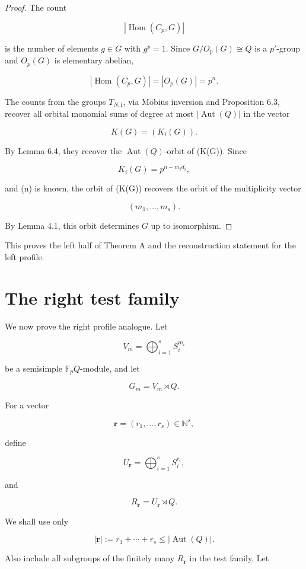 \documentclass[11pt]{article}
\begin{document}
\begin{proof}
The count

\[
|\operatorname{Hom}(C_p,G)|
\]

is the number of elements $g\in G$ with $g^p=1$. Since $G/O_p(G)\cong Q$ is a $p'$-group and $O_p(G)$ is elementary abelian,

\[
|\operatorname{Hom}(C_p,G)|=|O_p(G)|=p^n.
\]

The counts from the groups $T_{N,\mathbf i}$, via Möbius inversion and Proposition 6.3, recover all orbital monomial sums of degree at most $|\operatorname{Aut}(Q)|$ in the vector

\[
K(G)=(K_i(G)).
\]

By Lemma 6.4, they recover the $\operatorname{Aut}(Q)$-orbit of (K(G)). Since

\[
K_i(G)=p^{n-m_id_i},
\]

and (n) is known, the orbit of (K(G)) recovers the orbit of the multiplicity vector

\[
(m_1,\ldots,m_s).
\]

By Lemma 4.1, this orbit determines $G$ up to isomorphism.

\end{proof}

This proves the left half of Theorem A and the reconstruction statement for the left profile.

\section{The right test family}

We now prove the right profile analogue. Let

\[
V_m=\bigoplus_{i=1}^{s}S_i^{m_i}
\]

be a semisimple $\mathbb F_pQ$-module, and let

\[
G_m=V_m\rtimes Q.
\]

For a vector

\[
\mathbf r=(r_1,\ldots,r_s)\in\mathbb N^s,
\]

define

\[
U_{\mathbf r}=\bigoplus_{i=1}^{s}S_i^{r_i},
\]

and

\[
R_{\mathbf r}=U_{\mathbf r}\rtimes Q.
\]

We shall use only

\[
|\mathbf r|:=r_1+\cdots+r_s\le |\operatorname{Aut}(Q)|.
\]

Also include all subgroups of the finitely many $R_{\mathbf r}$ in the test family. Let
\end{document}
